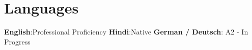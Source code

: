 \documentclass[letterpaper,11pt]{article}
\newcommand{\resumeSubHeadingListStart}{\begin{itemize}[leftmargin=0.15in, label={}]}
\newcommand{\resumeSubHeadingListEnd}{\end{itemize}}
\begin{document}
\vspace{-11pt} %

\section{Languages}
  \vspace{-0.5pt}
\resumeSubHeadingListStart
    \small{\item{
    \textbf{English}:Professional Proficiency \qquad 
    \textbf{Hindi}:Native \qquad 
    \textbf{German / Deutsch}: A2 - In Progress    
    
    }}
\resumeSubHeadingListEnd



    
    











\end{document}
